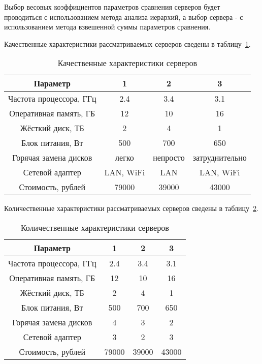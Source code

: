 Выбор весовых коэффициентов параметров сравнения серверов будет проводиться с использованием метода анализа иерархий, а выбор сервера - с использованием метода взвешенной суммы параметров сравнения.

Качественные характеристики рассматриваемых серверов сведены в таблицу~\ref{table:server_compare_qual}.

\begin{table}[h]
\caption{Качественные характеристики серверов}
\label{table:server_compare_qual}
\centering
  \begin{tabular}{|c|c|c|c|}
  \hline Параметр & 1 & 2 & 3 \\
  \hline Частота процессора, ГГц & 2.4 & 3.4 & 3.1 \\
  \hline Оперативная память, ГБ & 12 & 10 & 16 \\
  \hline Жёсткий диск, ТБ & 2 & 4 & 1 \\
  \hline Блок питания, Вт & 500 & 700 & 650 \\
  \hline Горячая замена дисков & легко & непросто & затруднительно \\
  \hline Сетевой адаптер & LAN, WiFi & LAN & LAN, WiFi\\
  \hline Стоимость, рублей & 79000 & 39000 & 43000 \\
  \hline
  \end{tabular}
\end{table}

Количественные характеристики рассматриваемых серверов сведены в таблицу~\ref{table:server_compare_numb}.

\begin{table}[h]
\caption{Количественные характеристики серверов}
\label{table:server_compare_numb}
\centering
  \begin{tabular}{|c|c|c|c|}
  \hline Параметр                & 1     & 2     & 3 \\
  \hline Частота процессора, ГГц & 2.4   & 3.4   & 3.1 \\
  \hline Оперативная память, ГБ  & 12    & 10    & 16 \\
  \hline Жёсткий диск, ТБ        & 2     & 4     & 1 \\
  \hline Блок питания, Вт        & 500   & 700   & 650 \\
  \hline Горячая замена дисков   & 4     & 3     & 2 \\
  \hline Сетевой адаптер         & 3     & 2     & 3 \\
  \hline Стоимость, рублей       & 79000 & 39000 & 43000 \\
  \hline
  \end{tabular}
\end{table}

